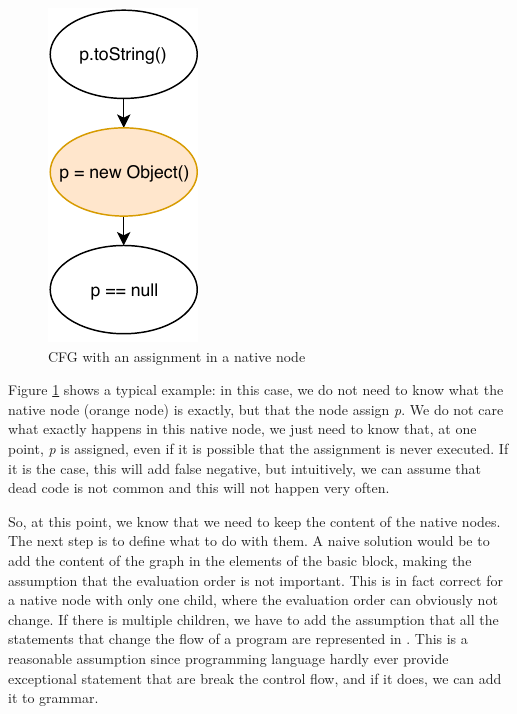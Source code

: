 \begin{figure}[h]
	\caption{CFG with an assignment in a native node}
	\label{figure:cfg-with-assignment-native}
	\includegraphics[]{figure/cfg-with-assignment-native.pdf}
\end{figure}

Figure \ref{figure:cfg-with-assignment-native} shows a typical example: in this case, we do not need to know what the native node (orange node) is exactly, but that the node assign \emph{p}. We do not care what exactly happens in this native node, we just need to know that, at one point, \emph{p} is assigned, even if it is possible that the assignment is never executed. If it is the case, this will add false negative, but intuitively, we can assume that dead code is not common and this will not happen very often.

So, at this point, we know that we need to keep the content of the native nodes. 
The next step is to define what to do with them. 
A naive solution would be to add the content of the graph in the elements of the basic block, making the assumption that the evaluation order is not important. 
This is in fact correct for a native node with only one child, where the evaluation order can obviously not change. 
If there is multiple children, we have to add the assumption that all the statements that change the flow of a program are represented in \slang{}. 
This is a reasonable assumption since programming language hardly ever provide exceptional statement that are break the control flow, and if it does, we can add it to \slang{} grammar.



